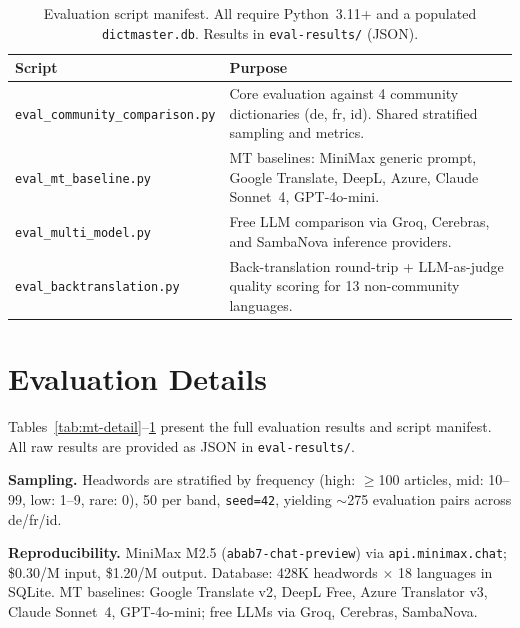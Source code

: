 \documentclass[11pt,a4paper]{article}
\begin{document}
\begin{table}[t]
\centering
\footnotesize
\begin{tabular}{lp{11cm}}
\toprule
\textbf{Script} & \textbf{Purpose} \\
\midrule
\texttt{eval\_community\_comparison.py} & Core evaluation against 4 community dictionaries (de, fr, id). Shared stratified sampling and metrics. \\
\texttt{eval\_mt\_baseline.py} & MT baselines: MiniMax generic prompt, Google Translate, DeepL, Azure, Claude Sonnet~4, GPT-4o-mini. \\
\texttt{eval\_multi\_model.py} & Free LLM comparison via Groq, Cerebras, and SambaNova inference providers. \\
\texttt{eval\_backtranslation.py} & Back-translation round-trip + LLM-as-judge quality scoring for 13 non-community languages. \\
\bottomrule
\end{tabular}
\caption{Evaluation script manifest. All require Python~3.11+ and a populated \texttt{dictmaster.db}. Results in \texttt{eval-results/} (JSON).}
\label{tab:scripts}
\end{table}

\section{Evaluation Details}

Tables~\ref{tab:mt-detail}--\ref{tab:scripts} present the full evaluation results and script manifest.
All raw results are provided as JSON in \texttt{eval-results/}.

\smallskip
\noindent\textbf{Sampling.}
Headwords are stratified by frequency (high: $\geq$100 articles, mid: 10--99, low: 1--9, rare: 0), 50 per band, \texttt{seed=42}, yielding ${\sim}$275 evaluation pairs across de/fr/id.

\smallskip
\noindent\textbf{Reproducibility.}
MiniMax M2.5 (\texttt{abab7-chat-preview}) via \texttt{api.minimax.chat}; \$0.30/M input, \$1.20/M output.
Database: 428K headwords $\times$ 18 languages in SQLite.
MT baselines: Google Translate v2, DeepL Free, Azure Translator v3, Claude Sonnet~4, GPT-4o-mini; free LLMs via Groq, Cerebras, SambaNova.
\end{document}
